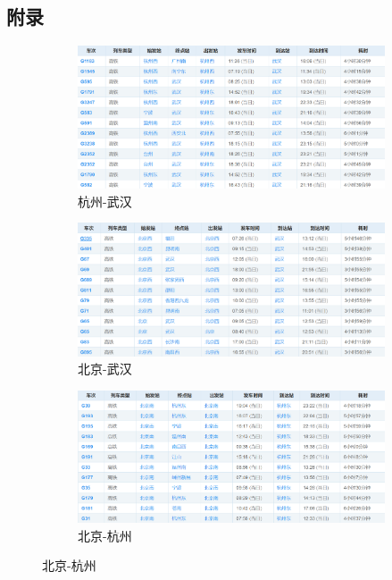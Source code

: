 \documentclass[12pt, a4paper, oneside]{ctexart}
\begin{document}
\subsection{附录}
\begin{figure}[htbp]
    \centering
    \begin{subfigure}{0.3\linewidth}
        \includegraphics[width=\linewidth]{src/H_w.png}
        \caption{杭州-武汉}
    \end{subfigure}
    \begin{subfigure}{0.3\linewidth}
        \includegraphics[width=\linewidth]{src/B_w.png}
        \caption{北京-武汉}
    \end{subfigure}
    \begin{subfigure}{0.3\linewidth}
        \includegraphics[width=\linewidth]{src/B_H.png}
        \caption{北京-杭州}

\end{subfigure}
\end{figure}
\end{document}

